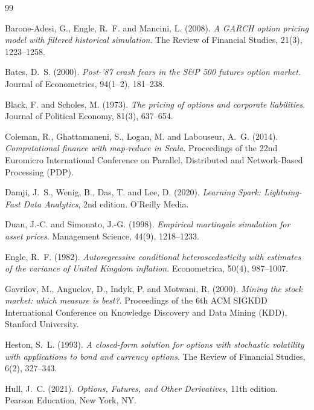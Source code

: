 \documentclass[12pt]{article}
\begin{document}
\begin{thebibliography}{99}

Barone-Adesi, G., Engle, R.~F. and Mancini, L. (2008).
\emph{A GARCH option pricing model with filtered historical simulation}.
The Review of Financial Studies, 21(3), 1223--1258.

Bates, D.~S. (2000).
\emph{Post-'87 crash fears in the S\&P 500 futures option market}.
Journal of Econometrics, 94(1--2), 181--238.

Black, F. and Scholes, M. (1973).
\emph{The pricing of options and corporate liabilities}.
Journal of Political Economy, 81(3), 637--654.

Coleman, R., Ghattamaneni, S., Logan, M. and Labouseur, A.~G. (2014).
\emph{Computational finance with map-reduce in Scala}.
Proceedings of the 22nd Euromicro International Conference on
Parallel, Distributed and Network-Based Processing (PDP).

Damji, J.~S., Wenig, B., Das, T. and Lee, D. (2020).
\emph{Learning Spark: Lightning-Fast Data Analytics}, 2nd edition.
O'Reilly Media.

Duan, J.-C. and Simonato, J.-G. (1998).
\emph{Empirical martingale simulation for asset prices}.
Management Science, 44(9), 1218--1233.

Engle, R.~F. (1982).
\emph{Autoregressive conditional heteroscedasticity with estimates of
the variance of United Kingdom inflation}.
Econometrica, 50(4), 987--1007.

Gavrilov, M., Anguelov, D., Indyk, P. and Motwani, R. (2000).
\emph{Mining the stock market: which measure is best?}.
Proceedings of the 6th ACM SIGKDD International Conference on
Knowledge Discovery and Data Mining (KDD), Stanford University.

Heston, S.~L. (1993).
\emph{A closed-form solution for options with stochastic volatility
with applications to bond and currency options}.
The Review of Financial Studies, 6(2), 327--343.

Hull, J.~C. (2021).
\emph{Options, Futures, and Other Derivatives}, 11th edition.
Pearson Education, New York, NY.


\end{thebibliography}
\end{document}
